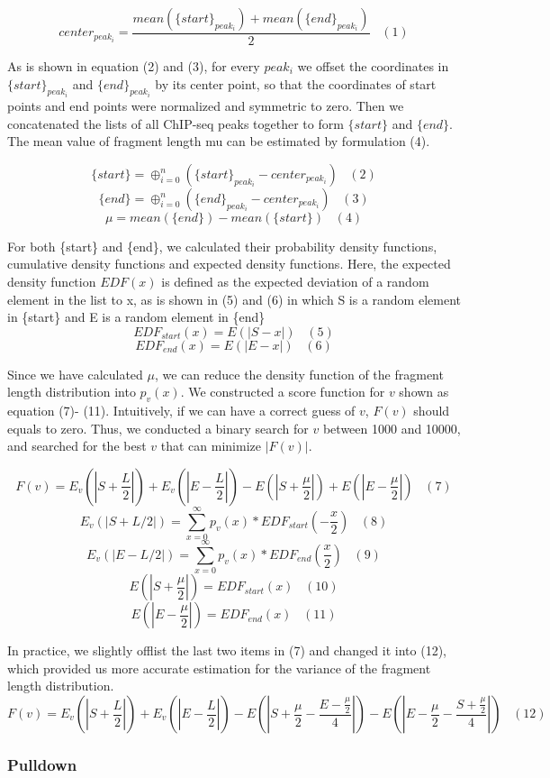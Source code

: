 \documentclass[12pt]{article}
\begin{document}
$$center_{peak_i} = \frac{mean(\{start\}_{peak_i}) + mean(\{end\}_{peak_i})}{2}\;\;\;(1)$$

As is shown in equation (2) and (3), for every $peak_i$ we offset the coordinates in $\{start\}_{peak_i}$ and $\{end\}_{peak_i}$ by its center point, so that the coordinates of start points and end points were normalized and symmetric to zero. Then we concatenated the lists of all ChIP-seq peaks together to form $\{start\}$ and $\{end\}$. The mean value of fragment length mu can be estimated by formulation (4).

$$\{start\} = \oplus_{i=0}^{n} (\{start\}_{peak_i} - center_{peak_i})\;\;\;(2)$$
$$\{end\} = \oplus_{i=0}^{n} (\{end\}_{peak_i} - center_{peak_i})\;\;\;(3)$$
$$\mu = mean(\{end\}) - mean(\{start\})\;\;\;(4)$$

For both \{start\} and \{end\}, we calculated their probability density functions, cumulative density functions and expected density functions. Here, the expected density function $EDF(x)$ is defined as the expected deviation of a random element in the list to x, as is shown in (5) and (6) in which S is a random element in \{start\} and E is a random element in \{end\}
$$EDF_{start}(x) = E(|S - x|)\;\;\;(5)$$
$$EDF_{end}(x) = E(|E - x|)\;\;\;(6)$$

Since we have calculated $\mu$, we can reduce the density function of the fragment length distribution into $p_v(x)$. We constructed a score function for $v$ shown as equation (7)- (11). Intuitively, if we can have a correct guess of $v$, $F(v)$ should equals to zero. Thus, we conducted a binary search for $v$ between 1000 and 10000, and searched for the best $v$ that can minimize $|F(v)|$.

$$F(v) = E_v(|S + \frac{L}{2}|) + E_v(|E - \frac{L}{2}|) - E(|S + \frac{\mu}{2}|) + E(|E- \frac{\mu}{2}|)\;\;\;(7)$$
$$E_v(|S + L/2|) = \sum_{x=0}^\infty p_v(x) * EDF_{start}(-\frac{x}{2})\;\;\;(8)$$
$$E_v(|E - L/2|) = \sum_{x=0}^\infty p_v(x) * EDF_{end}(\frac{x}{2})\;\;\;(9)$$
$$E(|S + \frac{\mu}{2}|)=EDF_{start}(x)\;\;\;(10)$$
$$E(|E - \frac{\mu}{2}|)=EDF_{end}(x)\;\;\;(11)$$

In practice, we slightly offlist the last two items in (7) and changed it into (12), which provided us more accurate estimation for the variance of the fragment length distribution.
$$F(v) = E_v(|S + \frac{L}{2}|) + E_v(|E - \frac{L}{2}|) - E(|S + \frac{\mu}{2} - \frac{E- \frac{\mu}{2}}{4}|) - E(|E- \frac{\mu}{2} - \frac{S + \frac{\mu}{2}}{4}|)\;\;\;(12)$$


\subsubsection*{Pulldown}
\end{document}
